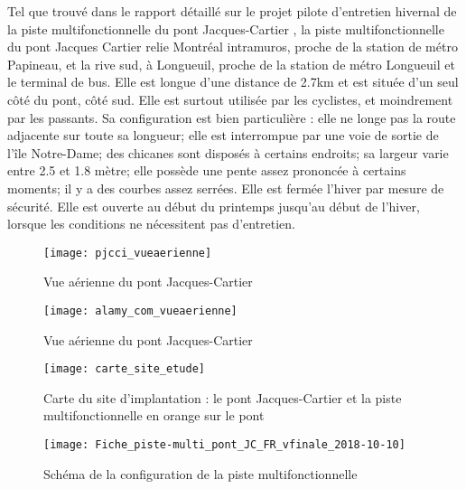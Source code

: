 ﻿\par Tel que trouvé dans le rapport détaillé sur le projet pilote d'entretien hivernal de la piste multifonctionnelle du pont Jacques-Cartier \cite{pjcci_rapport_2018}, la piste multifonctionnelle du pont Jacques Cartier relie Montréal intramuros, proche de la station de métro Papineau, et la rive sud, à Longueuil, proche de la station de métro Longueuil et le terminal de bus. Elle est longue d'une distance de 2.7km et est située d'un seul côté du pont, côté sud. Elle est surtout utilisée par les cyclistes, et moindrement par les passants. 
Sa configuration est bien particulière \cite{pjcci_fiche_2018}: elle ne longe pas la route adjacente sur toute sa longueur; elle est interrompue par une voie de sortie de l'île Notre-Dame; des chicanes sont disposés à certains endroits; sa largeur varie entre 2.5 et 1.8 mètre; elle possède une pente assez prononcée à certains moments; il y a des courbes assez serrées.
Elle est fermée l'hiver par mesure de sécurité. Elle est ouverte au début du printemps jusqu'au début de l'hiver, lorsque les conditions ne nécessitent pas d'entretien.
\label{pjcci_vueaerienne}
\begin{figure}
    \centering
    \texttt{[image: pjcci\_vueaerienne]}
    \caption{Vue aérienne du pont Jacques-Cartier}
    \label{fig:pjcci_vueaerienne}
\end{figure}
\label{alamy_com_vueaerienne}
\begin{figure}
    \centering
    \texttt{[image: alamy\_com\_vueaerienne]}
    \caption{Vue aérienne du pont Jacques-Cartier}
    \label{fig:alamy_com_vueaerienne}
\end{figure}
\label{carte_site_etude}
\begin{figure}
    \centering
    \texttt{[image: carte\_site\_etude]}
    \caption{Carte du site d'implantation : le pont Jacques-Cartier et la piste multifonctionnelle en orange sur le pont}
    \label{fig:carte_site_etude}
\end{figure}
\label{Fiche_piste-multi_pont_JC_FR_vfinale_2018-10-10}
\begin{figure}
    \centering
    \texttt{[image: Fiche\_piste-multi\_pont\_JC\_FR\_vfinale\_2018-10-10]}
    \caption{Schéma de la configuration de la piste multifonctionnelle}
    \label{fig:Fiche_piste-multi_pont_JC_FR_vfinale_2018-10-10}
\end{figure}